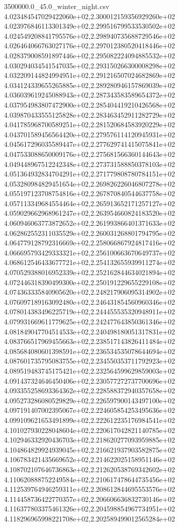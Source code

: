 \begin{filecontents*}{3500000.0_45.0_winter_night.csv}
4.023484547029422060e+02,2.300012159356929260e+02
4.023976846113301349e+02,2.299516799533530502e+02
4.024549208841795576e+02,2.298940735688729546e+02
4.026464066763027176e+02,2.297012380520418446e+02
4.028379008591897446e+02,2.295082224094885532e+02
4.030294034541547035e+02,2.293150266300008298e+02
4.032209144824994951e+02,2.291216507024682869e+02
4.034124339655265885e+02,2.289280946157869039e+02
4.036039619245088943e+02,2.287343583589654372e+02
4.037954983807472900e+02,2.285404419210426568e+02
4.039870433555125828e+02,2.283463452911282729e+02
4.041785968700589251e+02,2.281520684583920229e+02
4.043701589456564420e+02,2.279576114120945931e+02
4.045617296035589447e+02,2.277629741415075841e+02
4.047533088650009176e+02,2.275681566360144643e+02
4.049448967512242348e+02,2.273731588850378103e+02
4.051364932834704291e+02,2.271779808780784151e+02
4.053280984829451654e+02,2.269826226046807278e+02
4.055197123708754816e+02,2.267870840544637758e+02
4.057113349684554464e+02,2.265913652171257127e+02
4.059029662968961247e+02,2.263954660824183520e+02
4.060946063773872652e+02,2.261993866401371633e+02
4.062862552311035529e+02,2.260031268801794795e+02
4.064779128792316669e+02,2.258066867924817416e+02
4.066695793429333321e+02,2.256100663670649737e+02
4.068612546433677721e+02,2.254132655939911274e+02
4.070529388016952339e+02,2.252162844634021894e+02
4.072446318390499300e+02,2.250191229655229108e+02
4.074363335840905620e+02,2.248217906095314902e+02
4.076097189163092480e+02,2.246431854560960346e+02
4.078014383496225719e+02,2.244455535320948911e+02
4.079931669611779625e+02,2.242477643850361346e+02
4.081849047704514533e+02,2.240498180051317831e+02
4.083766517969455663e+02,2.238517143826411484e+02
4.085684080601398591e+02,2.236534535078644694e+02
4.087601735795083755e+02,2.234550353711792923e+02
4.089519483745175421e+02,2.232564599629859003e+02
4.091437324646450406e+02,2.230577272737700696e+02
4.093355258693364362e+02,2.228588372940357658e+02
4.095273286080529829e+02,2.226597900143497100e+02
4.097191407002395067e+02,2.224605854253495636e+02
4.099109621653491899e+02,2.222612235176984541e+02
4.101027930228048604e+02,2.220617042821140785e+02
4.102946332920436703e+02,2.218620277093959885e+02
4.104864829924939045e+02,2.216621937903582875e+02
4.106783421435669652e+02,2.214622025158951146e+02
4.108702107646736863e+02,2.212620538769342602e+02
4.110620888752249584e+02,2.210617478644735456e+02
4.112539764946259311e+02,2.208612844695553576e+02
4.114458736422770357e+02,2.206606636832730146e+02
4.116377803375461326e+02,2.204598854967734951e+02
4.118296965998221708e+02,2.202589499012565284e+02

\end{filecontents*}
